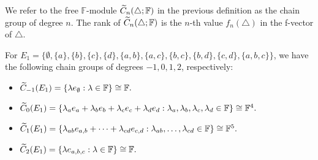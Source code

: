 \begin{defn}
    We refer to the free $\mathbb{F}$-module $\widetilde{C}_n(\triangle; \mathbb{F})$ in the previous definition as the chain group of degree $n$. The rank of  $\widetilde{C}_n(\triangle; \mathbb{F})$ is the $n$-th value $f_n(\triangle)$ in the f-vector of $\triangle$.

\begin{eg}
For $E_1 = \{\emptyset, \{a\},\{b\},\{c\}, \{d\}, \{a,b\}, \{a,c\}, \{b,c\}, \{b,d\}, \{c,d\}, \{a,b,c\}\}$, we have the following chain groups of degrees $-1,0,1,2$, respectively:
\begin{itemize}
    \item $\widetilde{C}_{-1}(E_1) = \{\lambda e_{\emptyset}: \lambda \in \mathbb{F}\} \cong \mathbb{F}.$
    \item $\widetilde{C}_{0}(E_1) = \{\lambda_{a} e_{a} + \lambda_{b} e_{b}  + \lambda_{c} e_{c} + \lambda_{d} e_{d}: \lambda_{a}, \lambda_{b}, \lambda_{c}, \lambda_{d} \in \mathbb{F}\} \cong \mathbb{F}^4.$
    \item $\widetilde{C}_{1}(E_1) = \{\lambda_{a b} e_{a,b} + \cdots  + \lambda_{c d} e_{c,d} : \lambda_{a b}, \dots,  \lambda_{c d} \in \mathbb{F}\} \cong \mathbb{F}^5.$
    \item $\widetilde{C}_{2}(E_1) = \{\lambda e_{a,b,c}: \lambda \in \mathbb{F}\} \cong \mathbb{F}.$
\end{itemize}
\end{eg}
\end{defn}

